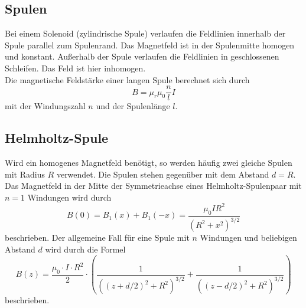 \subsection{Spulen}
Bei einem Solenoid (zylindrische Spule) verlaufen die Feldlinien innerhalb der Spule parallel zum Spulenrand. Das Magnetfeld ist in der Spulenmitte homogen und konstant.
Außerhalb der Spule verlaufen die Feldlinien in geschlossenen Schleifen. Das Feld ist hier inhomogen.\\
Die magnetische Feldstärke einer langen Spule berechnet sich durch
\begin{equation}
    B = \mu_r \mu_0 \frac{n}{l} I
\end{equation}
mit der Windungszahl $n$ und der Spulenlänge $l$.\\

\subsection{Helmholtz-Spule}
Wird ein homogenes Magnetfeld benötigt, so werden häufig zwei gleiche Spulen mit Radius $R$ verwendet.
Die Spulen stehen gegenüber mit dem Abstand $d=R$. Das Magnetfeld in der Mitte der Symmetrieachse eines Helmholtz-Spulenpaar mit $n=1$ Windungen wird durch
\begin{equation}
    B(0) = B_1(x) + B_1(-x) = \frac{\mu_0 I R^2}{(R^2+x^2)^{3/2}}
\end{equation}
beschrieben. Der allgemeine Fall für eine Spule mit $n$ Windungen und beliebigen Abstand $d$ wird durch die Formel %
\begin{equation}
    B(z) = \frac{\mu_0 \cdot I \cdot R^2}{2} \cdot \left ( \frac{1}{\left((z+d/2)^2+R^2\right)^{3/2}} + \frac{1}{\left((z-d/2)^2+R^2\right)^{3/2}} \right )
    \label{eqn:helm}
\end{equation}
beschrieben.